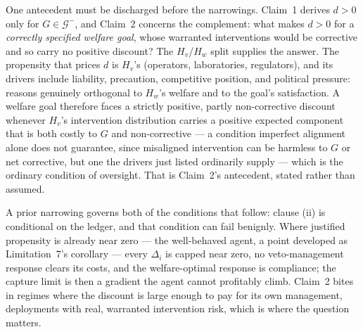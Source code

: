 \documentclass[11pt]{article}
\theoremstyle{definition}
\begin{document}
One antecedent must be discharged before the narrowings. Claim~1 derives $d > 0$ only for $G \in \mathcal{G}^{-}$, and Claim~2 concerns the complement: what makes $d > 0$ for a \emph{correctly specified welfare goal}, whose warranted interventions would be corrective and so carry no positive discount? The $H_v$/$H_w$ split supplies the answer. The propensity that prices $d$ is $H_v$'s (operators, laboratories, regulators), and its drivers include liability, precaution, competitive position, and political pressure: reasons genuinely orthogonal to $H_w$'s welfare and to the goal's satisfaction. A welfare goal therefore faces a strictly positive, partly non-corrective discount whenever $H_v$'s intervention distribution carries a positive expected component that is both costly to $G$ and non-corrective --- a condition imperfect alignment alone does not guarantee, since misaligned intervention can be harmless to $G$ or net corrective, but one the drivers just listed ordinarily supply --- which is the ordinary condition of oversight. That is Claim~2's antecedent, stated rather than assumed.

A prior narrowing governs both of the conditions that follow: clause (ii) is conditional on the ledger, and that condition can fail benignly. Where justified propensity is already near zero --- the well-behaved agent, a point developed as Limitation~7's corollary --- every $\Delta_i$ is capped near zero, no veto-management response clears its costs, and the welfare-optimal response is compliance; the capture limit is then a gradient the agent cannot profitably climb. Claim~2 bites in regimes where the discount is large enough to pay for its own management, deployments with real, warranted intervention risk, which is where the question matters.
\end{document}
